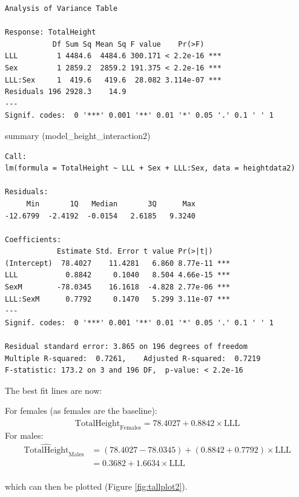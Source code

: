 \documentclass[
  oneside]{krantz}
\newenvironment{Shaded}{\begin{snugshade}}{\end{snugshade}}
\newcommand{\FunctionTok}[1]{\textcolor[rgb]{0.00,0.00,0.00}{#1}}
\newcommand{\NormalTok}[1]{#1}
\begin{document}
\begin{verbatim}
Analysis of Variance Table

Response: TotalHeight
           Df Sum Sq Mean Sq F value    Pr(>F)    
LLL         1 4484.6  4484.6 300.171 < 2.2e-16 ***
Sex         1 2859.2  2859.2 191.375 < 2.2e-16 ***
LLL:Sex     1  419.6   419.6  28.082 3.114e-07 ***
Residuals 196 2928.3    14.9                      
---
Signif. codes:  0 '***' 0.001 '**' 0.01 '*' 0.05 '.' 0.1 ' ' 1
\end{verbatim}

\begin{Shaded}
\begin{Highlighting}[]
\FunctionTok{summary}\NormalTok{ (model\_height\_interaction2)}
\end{Highlighting}
\end{Shaded}

\begin{verbatim}
Call:
lm(formula = TotalHeight ~ LLL + Sex + LLL:Sex, data = heightdata2)

Residuals:
     Min       1Q   Median       3Q      Max 
-12.6799  -2.4192  -0.0154   2.6185   9.3240 

Coefficients:
            Estimate Std. Error t value Pr(>|t|)    
(Intercept)  78.4027    11.4281   6.860 8.77e-11 ***
LLL           0.8842     0.1040   8.504 4.66e-15 ***
SexM        -78.0345    16.1618  -4.828 2.77e-06 ***
LLL:SexM      0.7792     0.1470   5.299 3.11e-07 ***
---
Signif. codes:  0 '***' 0.001 '**' 0.01 '*' 0.05 '.' 0.1 ' ' 1

Residual standard error: 3.865 on 196 degrees of freedom
Multiple R-squared:  0.7261,    Adjusted R-squared:  0.7219 
F-statistic: 173.2 on 3 and 196 DF,  p-value: < 2.2e-16
\end{verbatim}

The best fit lines are now:

For females (as females are the baseline):
\[\mathrm{\widehat{TotalHeight}_{Females}} = 78.4027 + 0.8842 \times \mathrm{LLL}\]
For males:
\begin{align}
\mathrm{\widehat{TotalHeight}_{Males}} & = (78.4027-78.0345) + (0.8842+0.7792) \times \mathrm{LLL}\\
& = 0.3682 + 1.6634 \times \mathrm{LLL}\\
\end{align}

which can then be plotted (Figure \ref{fig:tallplot2}).
\end{document}
